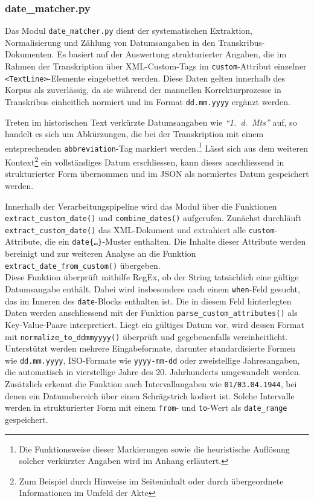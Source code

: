 \documentclass[12pt, a4paper, ngerman, bidi=default]{article}
\begin{document}
\subsubsection*{date\_matcher.py}\label{subsection:date_matcher}
Das Modul \texttt{date\_matcher.py} dient der systematischen Extraktion, Normalisierung und 
Zählung von Datumsangaben in den Transkribus-Dokumenten. Es basiert auf der 
Auswertung strukturierter Angaben, die im Rahmen der Transkription über XML-Custom-Tags im 
\texttt{custom}-Attribut einzelner \texttt{<TextLine>}-Elemente eingebettet werden. Diese 
Daten gelten innerhalb des Korpus als zuverlässig, da sie während der manuellen Korrekturprozesse
in Transkribus einheitlich normiert und im Format \texttt{dd.mm.yyyy} ergänzt werden.


Treten im historischen Text verkürzte Datumsangaben wie \textit{\enquote{1.~d.~Mts}} auf, so handelt
es sich um Abkürzungen, die bei der Transkription mit einem entsprechenden \texttt{abbreviation}-Tag
markiert werden.\footnote{Die Funktionsweise dieser Markierungen sowie die heuristische Auflösung solcher
verkürzter Angaben wird im Anhang  erläutert.} Lässt sich aus dem weiteren 
Kontext\footnote{Zum Beispiel durch Hinweise im Seiteninhalt oder durch übergeordnete Informationen im Umfeld der Akte} 
ein vollständiges Datum erschliessen, kann dieses anschliessend in strukturierter Form übernommen und im JSON als 
normiertes Datum gespeichert werden.

Innerhalb der Verarbeitungspipeline wird das Modul über die Funktionen \texttt{extract\_custom\_date()} und 
\texttt{combine\_dates()} aufgerufen. Zunächst durchläuft \texttt{extract\_custom\_date()} das XML-Dokument 
und extrahiert alle \texttt{custom}-Attribute, die ein \texttt{date\{…\}}-Muster enthalten. Die Inhalte dieser 
Attribute werden bereinigt und zur weiteren Analyse an die Funktion \texttt{extract\_date\_from\_custom()} übergeben.\\
Diese Funktion überprüft mithilfe RegEx, ob der String tatsächlich eine gültige Datumsangabe enthält. 
Dabei wird insbesondere nach einem \texttt{when}-Feld gesucht, das im Inneren des \texttt{date}-Blocks enthalten ist. 
Die in diesem Feld hinterlegten Daten werden anschliessend mit der Funktion \texttt{parse\_custom\_attributes()} als 
Key-Value-Paare interpretiert. Liegt ein gültiges Datum vor, wird dessen Format mit \texttt{normalize\_to\_ddmmyyyy()} 
überprüft und gegebenenfalls vereinheitlicht.
\\
Unterstützt werden mehrere Eingabeformate, darunter standardisierte Formen wie \texttt{dd.mm.yyyy}, ISO-Formate 
wie \texttt{yyyy-mm-dd} oder zweistellige Jahresangaben, die automatisch in vierstellige Jahre des 20.
Jahrhunderts umgewandelt werden. Zusätzlich erkennt die Funktion auch Intervallangaben wie \texttt{01/03.04.1944}, 
bei denen ein Datumsbereich über einen Schrägstrich kodiert ist. Solche Intervalle werden in strukturierter Form mit 
einem \texttt{from}- und \texttt{to}-Wert als \texttt{date\_range} gespeichert.
\end{document}
